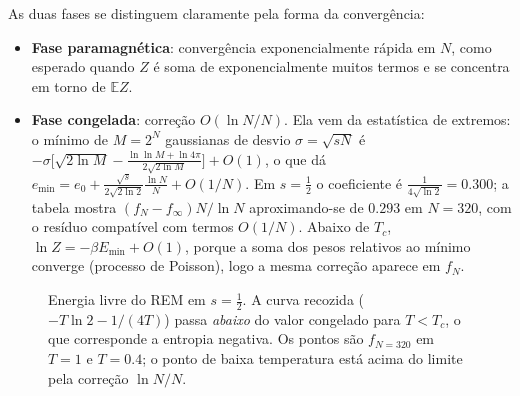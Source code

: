 \documentclass[11pt,a4paper]{article}
\newcommand{\E}{\mathbb{E}}
\begin{document}
As duas fases se distinguem claramente pela forma da convergência:
\begin{itemize}
\item \textbf{Fase paramagnética}: convergência exponencialmente rápida em $N$, como esperado quando
$Z$ é soma de exponencialmente muitos termos e se concentra em torno de $\E Z$.
\item \textbf{Fase congelada}: correção $O(\ln N/N)$. Ela vem da estatística de extremos: o mínimo de $M=2^N$
gaussianas de desvio $\sigma=\sqrt{sN}$ é $-\sigma\big[\sqrt{2\ln M}-\frac{\ln\ln M+\ln4\pi}{2\sqrt{2\ln M}}\big]+O(1)$,
o que dá $e_{\min}=e_0+\frac{\sqrt s}{2\sqrt{2\ln2}}\frac{\ln N}{N}+O(1/N)$. Em $s=\tfrac12$ o coeficiente é
$\frac{1}{4\sqrt{\ln2}}=0.300$; a tabela mostra $(f_N-f_\infty)N/\ln N$ aproximando-se de $0.293$ em
$N=320$, com o resíduo compatível com termos $O(1/N)$. Abaixo de $T_c$, $\ln Z=-\beta E_{\min}+O(1)$,
porque a soma dos pesos relativos ao mínimo converge (processo de Poisson), logo a mesma correção
aparece em $f_N$.
\end{itemize}

\begin{figure}[h]
\centering
{}
\caption{Energia livre do REM em $s=\tfrac12$. A curva recozida ($-T\ln2-1/(4T)$) passa \emph{abaixo}
do valor congelado para $T<T_c$, o que corresponde a entropia negativa. Os pontos são $f_{N=320}$ em
$T=1$ e $T=0.4$; o ponto de baixa temperatura está acima do limite pela correção $\ln N/N$.}
\end{figure}
\end{document}
